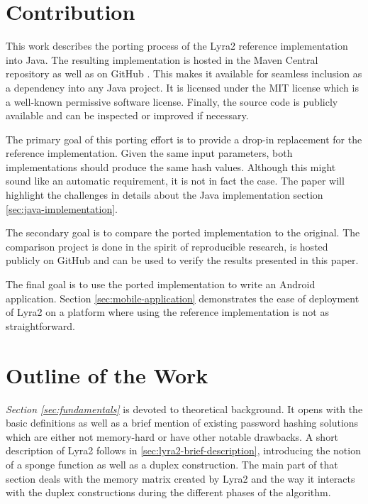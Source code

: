 \section{Contribution}
This work describes the porting process of the Lyra2 reference implementation into Java. The resulting implementation is hosted in the Maven Central repository \cite{maven:2017:lyra2} as well as on GitHub \cite{github:2017:lyra2-java}. This makes it available for seamless inclusion as a dependency into any Java project. It is licensed under the MIT license which is a well-known permissive software license. Finally, the source code is publicly available and can be inspected or improved if necessary.

The primary goal of this porting effort is to provide a drop-in replacement for the reference implementation. Given the same input parameters, both implementations should produce the same hash values. Although this might sound like an automatic requirement, it is not in fact the case. The paper will highlight the challenges in details about the Java implementation section \ref{sec:java-implementation}.

The secondary goal is to compare the ported implementation to the original. The comparison project is done in the spirit of reproducible research, is hosted publicly on GitHub \cite{github:2017:lyra2-compare} and can be used to verify the results presented in this paper.

The final goal is to use the ported implementation to write an Android application. Section \ref{sec:mobile-application} demonstrates the ease of deployment of Lyra2 on a platform where using the reference implementation is not as straightforward.

\section{Outline of the Work}

\emph{Section \ref{sec:fundamentals}} is devoted to theoretical background. It opens with the basic definitions as well as a brief mention of existing password hashing solutions which are either not memory-hard or have other notable drawbacks. A short description of Lyra2 follows in \ref{sec:lyra2-brief-description}, introducing the notion of a sponge function as well as a duplex construction. The main part of that section deals with the memory matrix created by Lyra2 and the way it interacts with the duplex constructions during the different phases of the algorithm.

